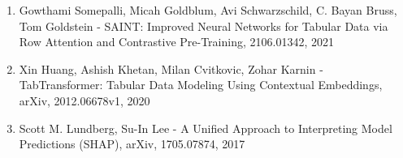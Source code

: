 \documentclass[12pt]{article}
\begin{document}
\begin{enumerate}
    \item Gowthami Somepalli, Micah Goldblum, Avi Schwarzschild, C. Bayan Bruss, Tom Goldstein - SAINT: Improved Neural Networks for Tabular Data via Row Attention and Contrastive Pre-Training, 2106.01342, 2021

    \item Xin Huang, Ashish Khetan, Milan Cvitkovic, Zohar Karnin - TabTransformer: Tabular Data Modeling Using Contextual Embeddings, arXiv, 2012.06678v1, 2020

    \item Scott M. Lundberg, Su-In Lee - A Unified Approach to Interpreting Model Predictions (SHAP), arXiv, 1705.07874, 2017

\end{enumerate}
\end{document}
